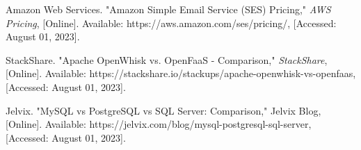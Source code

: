 \begin{sloppypar}
\begin{enumerate}[label={[\arabic*]}]
    \item Amazon Web Services. "Amazon Simple Email Service (SES) Pricing," \textit{AWS Pricing}, [Online]. Available: https://aws.amazon.com/ses/pricing/, [Accessed: August 01, 2023].

    \item StackShare. "Apache OpenWhisk vs. OpenFaaS - Comparison," \textit{StackShare}, [Online]. Available: https://stackshare.io/stackups/apache-openwhisk-vs-openfaas, [Accessed: August 01, 2023].

    \item Jelvix. "MySQL vs PostgreSQL vs SQL Server: Comparison," Jelvix Blog, [Online]. Available: https://jelvix.com/blog/mysql-postgresql-sql-server, [Accessed: August 01, 2023].














  \end{enumerate}

\end{sloppypar}
\newpage

